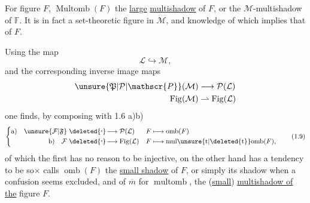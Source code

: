 
For  figure $F$, $\operatorname{Multomb}(F)$   the \uline{large} \uline{multishadow} of $F$, or the $\mathcal{M}$-multishadow of $\mathbb{F}$.  It is in fact a set-theoretic figure in $\mathcal{M}$, and knowledge of which implies that of $F$.

 Using   the map
\[
\mathcal{L}\hookrightarrow\mathcal{M},
\]
and the corresponding inverse image maps
\[
\begin{aligned}
\unsure{\mathfrak{P}|\mathcal{P}|\mathscr{P}}(\mathcal{M})&\longrightarrow\mathcal{P}(\mathcal{L})\\
\operatorname{Fig}(\mathcal{M})&\rightharpoonup\operatorname{Fig}(\mathcal{L})
\end{aligned}
\]
one finds, by composing with 1.6 a)b)
\[
\left\{\begin{aligned}
\text{a)}\quad \unsure{\mathcal{F}|\mathfrak{F}}&\mathrel{\deleted{\lhook}\!\longrightarrow}\mathcal{P}(\mathcal{L})&
 F&\longmapsto\operatorname{omb}(F)\\
\text{b)}\quad \mathcal{F}&\mathrel{\deleted{\lhook}\!\longrightarrow}\operatorname{Fig}(\mathcal{L})&
 F&\longmapsto\operatorname{mul\unsure{t|\deleted{t}}omb}(F),
\end{aligned}\right.\tag*{(1.9)}
\]
of which the first has no reason to be injective,  on the other hand has a tendency to be so$\times$   calls $\operatorname{omb}(F)$ the \uline{small shadow} of $F$, or simply its shadow when a confusion seems excluded, and of $\overline m$ for $\operatorname{multomb}$, the (\uline{small}) \uline{multishadow of the} figure $F$.
